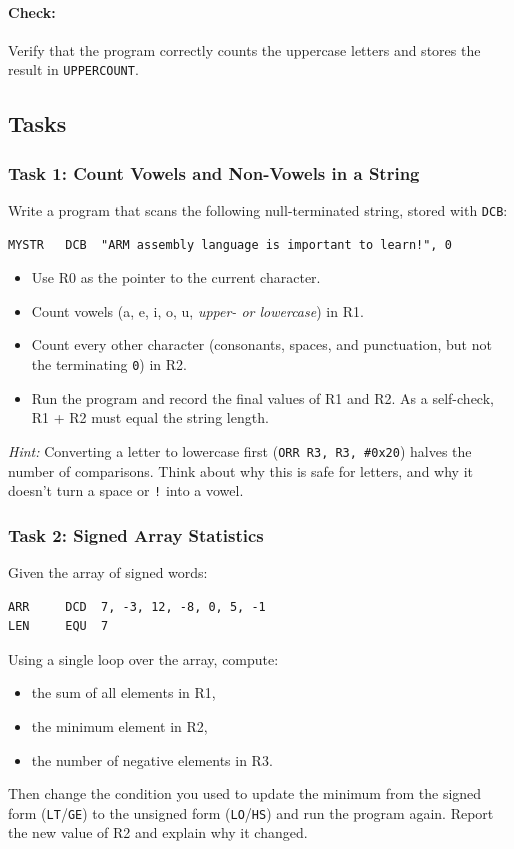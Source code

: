 \paragraph{Check:} Verify that the program correctly counts the uppercase letters and stores the result in \texttt{UPPERCOUNT}.

\newpage
\subsection{Tasks}

\subsubsection{Task 1: Count Vowels and Non-Vowels in a String}
Write a program that scans the following null-terminated string, stored with \texttt{DCB}:
\begin{lstlisting}
MYSTR   DCB  "ARM assembly language is important to learn!", 0
\end{lstlisting}
\begin{itemize}[nosep]
    \item Use R0 as the pointer to the current character.
    \item Count vowels (a, e, i, o, u, \emph{upper- or lowercase}) in R1.
    \item Count every other character (consonants, spaces, and punctuation, but not the terminating \texttt{0}) in R2.
    \item Run the program and record the final values of R1 and R2. As a self-check, R1 + R2 must equal the string length.
\end{itemize}
\emph{Hint:} Converting a letter to lowercase first (\texttt{ORR R3, R3, \#0x20}) halves the number of comparisons. Think about why this is safe for letters, and why it doesn't turn a space or \texttt{!} into a vowel.

\subsubsection{Task 2: Signed Array Statistics}
Given the array of signed words:
\begin{lstlisting}
ARR     DCD  7, -3, 12, -8, 0, 5, -1
LEN     EQU  7
\end{lstlisting}
Using a single loop over the array, compute:
\begin{itemize}[nosep]
    \item the sum of all elements in R1,
    \item the minimum element in R2,
    \item the number of negative elements in R3.
\end{itemize}
Then change the condition you used to update the minimum from the signed form (\texttt{LT}/\texttt{GE}) to the unsigned form (\texttt{LO}/\texttt{HS}) and run the program again. Report the new value of R2 and explain why it changed.
